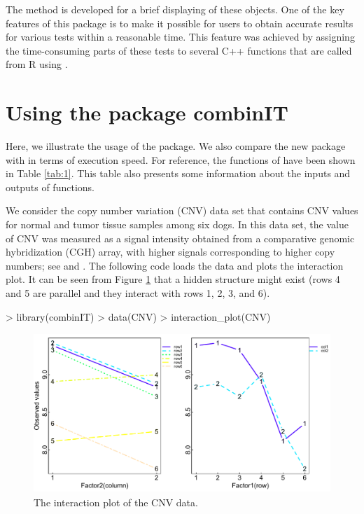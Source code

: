  {The  method} is developed for a brief displaying of these objects. One of the key features of this package is to make it possible for users to obtain accurate results for various tests within a reasonable time. This feature was achieved by assigning the time-consuming parts of these tests to several C++ functions that are called from R using . %


\section{Using the package combinIT}
Here, we illustrate the usage of the  package. We also compare the new package with  in terms of execution speed. For reference, the functions of  have been shown in Table \ref{tab:1}. This table also presents some information about the inputs and outputs of functions. 

We consider the copy number variation (CNV) data set that contains CNV values for normal and tumor tissue samples among six dogs. In this data set, the value of CNV was measured as a signal intensity obtained from a comparative genomic hybridization (CGH) array, with higher signals corresponding to higher copy numbers; see \citet{Franck:2013} and \citet{Osborne:2016}. The following code loads the data and plots the interaction plot. It can be seen from Figure \ref{fig:1} that a hidden structure might exist (rows 4 and 5 are parallel and they interact with rows 1, 2, 3, and 6).

\begin{example}
	> library(combinIT)
	> data(CNV)
	> interaction_plot(CNV)
\end{example}

\begin{figure}[htbp]
	\centering
	\includegraphics[width=14cm, height=6cm]{interactionplot1.pdf}
	\caption{The interaction plot of the CNV data.}
	\label{fig:1}
\end{figure}

